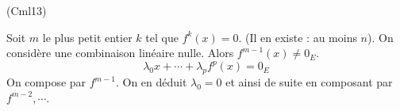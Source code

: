 \begin{tiny}(Cml13)\end{tiny} Soit $m$ le plus petit entier $k$ tel que $f^k(x) = 0$. (Il en existe : au moins $n$). On considère une combinaison linéaire nulle. Alors $f^{m-1}(x)\neq 0_E$. 
\begin{displaymath}
 \lambda_0x + \cdots + \lambda_p f^p(x) = 0_E
\end{displaymath}
On compose par $f^{m-1}$. On en déduit $\lambda_0 =0$ et ainsi de suite en composant par $f^{m-2}, \cdots$.